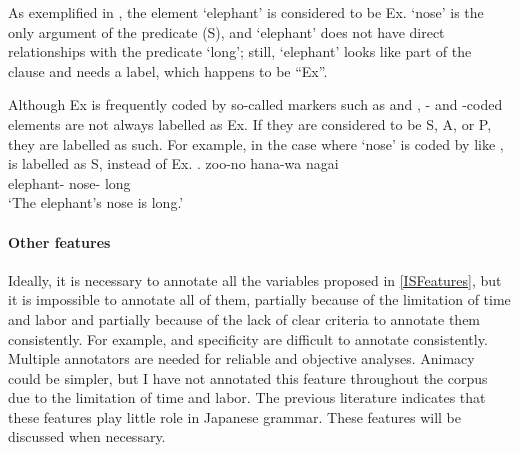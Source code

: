 As exemplified in \Last,
the element  `elephant' is considered to be Ex.
 `nose' is the only argument of the predicate (S),
and  `elephant' does not have direct relationships with the predicate  `long';
still,  `elephant' looks like part of the clause and needs a label,
which happens to be ``Ex''.

Although Ex is frequently coded by so-called  markers
such as  and ,
- and -coded elements are not always labelled as Ex.
If they are considered to be S, A, or P,
they are labelled as such.
For example, in the case where  `nose' is coded by  like \Next,
 is labelled as S, instead of Ex.
%
\exg. zoo-no hana-wa nagai \\
      elephant- nose- long \\
      `The elephant's nose is long.'








\paragraph{Other features}

Ideally, it is necessary to annotate all the variables proposed in \ref{ISFeatures},
but it is impossible to annotate all of them,
partially because of the limitation of time and labor and 
partially because of the lack of clear criteria to annotate them consistently.
For example,  and specificity are difficult to annotate consistently.
Multiple annotators are needed for reliable and objective analyses.
Animacy could be simpler, but I have not annotated this feature throughout the corpus due to the limitation of time and labor.
The previous literature indicates that
these features play little role in Japanese grammar.
These features will be discussed when necessary.

